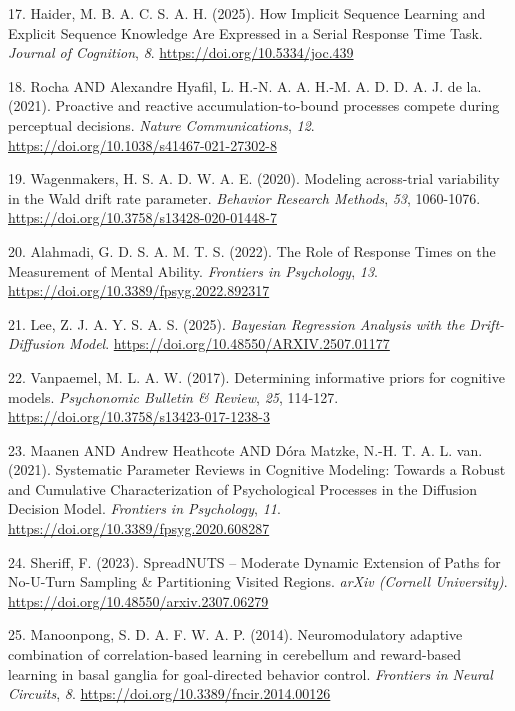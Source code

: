\documentclass[
  spanish,
  10pt,
]{article}
\newlength{\cslhangindent}
\newenvironment{CSLReferences}[2] %
 {\begin{list}{}{%
  \setlength{\itemindent}{0pt}
  \setlength{\leftmargin}{0pt}
  \setlength{\parsep}{0pt}
  \ifodd #1
   \setlength{\leftmargin}{\cslhangindent}
   \setlength{\itemindent}{-1\cslhangindent}
  \fi
  \setlength{\itemsep}{#2\baselineskip}}}
 {\end{list}}
\begin{document}
\begin{CSLReferences}{1}{0}
17. Haider, M. B. A. C. S. A. H. (2025). How Implicit Sequence Learning
and Explicit Sequence Knowledge Are Expressed in a Serial Response Time
Task. \emph{Journal of Cognition}, \emph{8}.
\url{https://doi.org/10.5334/joc.439}

18. Rocha AND Alexandre Hyafil, L. H.-N. A. A. H.-M. A. D. D. A. J. de
la. (2021). Proactive and reactive accumulation-to-bound processes
compete during perceptual decisions. \emph{Nature Communications},
\emph{12}. \url{https://doi.org/10.1038/s41467-021-27302-8}

19. Wagenmakers, H. S. A. D. W. A. E. (2020). Modeling across-trial
variability in the Wald drift rate parameter. \emph{Behavior Research
Methods}, \emph{53}, 1060-1076.
\url{https://doi.org/10.3758/s13428-020-01448-7}

20. Alahmadi, G. D. S. A. M. T. S. (2022). The Role of Response Times on
the Measurement of Mental Ability. \emph{Frontiers in Psychology},
\emph{13}. \url{https://doi.org/10.3389/fpsyg.2022.892317}

21. Lee, Z. J. A. Y. S. A. S. (2025). \emph{Bayesian Regression Analysis
with the Drift-Diffusion Model}.
\url{https://doi.org/10.48550/ARXIV.2507.01177}

22. Vanpaemel, M. L. A. W. (2017). Determining informative priors for
cognitive models. \emph{Psychonomic Bulletin \& Review}, \emph{25},
114-127. \url{https://doi.org/10.3758/s13423-017-1238-3}

23. Maanen AND Andrew Heathcote AND Dóra Matzke, N.-H. T. A. L. van.
(2021). Systematic Parameter Reviews in Cognitive Modeling: Towards a
Robust and Cumulative Characterization of Psychological Processes in the
Diffusion Decision Model. \emph{Frontiers in Psychology}, \emph{11}.
\url{https://doi.org/10.3389/fpsyg.2020.608287}

24. Sheriff, F. (2023). SpreadNUTS -- Moderate Dynamic Extension of
Paths for No-U-Turn Sampling \& Partitioning Visited Regions.
\emph{arXiv (Cornell University)}.
\url{https://doi.org/10.48550/arxiv.2307.06279}

25. Manoonpong, S. D. A. F. W. A. P. (2014). Neuromodulatory adaptive
combination of correlation-based learning in cerebellum and reward-based
learning in basal ganglia for goal-directed behavior control.
\emph{Frontiers in Neural Circuits}, \emph{8}.
\url{https://doi.org/10.3389/fncir.2014.00126}


\end{CSLReferences}
\end{document}
